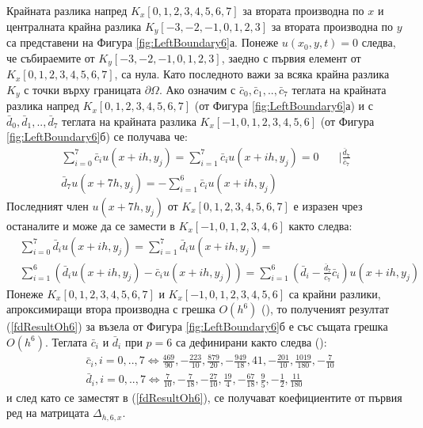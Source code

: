 \documentclass[a4paper]{article}
\newcommand{\rf}[1]{(\ref{#1})}
\theoremstyle{remark}
\begin{document}
\begin{large}
Крайната разлика напред $K_x[0,1,2,3,4,5,6,7]$ за втората производна по $x$ и централната крайна разлика $K_y[-3,-2,-1,0,1,2,3]$ за втората производна по $y$ са представени на Фигура \ref{fig:LeftBoundary6}а. Понеже $u(x_0, y, t) = 0$ следва, че събираемите от $K_y[-3,-2,-1,0,1,2,3]$, заедно с първия елемент от $K_x[0,1,2,3,4,5,6,7]$, са нула. Като последното важи за всяка крайна разлика $K_y$ с точки върху границата $\partial \Omega$. Ако означим с $\bar c_0, \bar c_1, .., \bar c_7$ теглата на крайната разлика напред $K_x[0,1,2,3,4,5,6,7]$ (от Фигура \ref{fig:LeftBoundary6}а) и с $\bar d_0, \bar d_1,.., \bar d_7$ теглата на крайната разлика $K_x[-1,0,1,2,3,4,5,6]$ (от Фигура \ref{fig:LeftBoundary6}б) се получава че:
\begin{align}\label{deltaOh6Zero}
\sum\limits_{i=0}^{7} \bar c_i u(x+ih, y_j) = \sum\limits_{i=1}^{7} \bar c_i u(x+ih, y_j) = 0 &  \quad | \frac{\bar d_7}{\bar c_7} \nonumber\\
\bar d_7 u(x+7h, y_j) = -\sum\limits_{i=1}^{6} \bar c_i u(x+ih, y_j) & 
\end{align}
Последният член $u(x+7h, y_j)$ от $K_x[0,1,2,3,4,5,6,7]$ е изразен чрез останалите и може да се замести в $K_x[-1,0,1,2,3,4,6]$ както следва:
\begin{align}\label{fdResultOh6}
&\sum\limits_{i=0}^{7} \bar d_i u(x+ih, y_j) = \sum\limits_{i=1}^{7} \bar d_i u(x+ih, y_j)  =  \\
&\sum\limits_{i=1}^{6} \left( \bar d_i u(x+ih, y_j) - \bar c_i u(x+ih, y_j) \right) = \sum\limits_{i=1}^{6} \left( \bar d_i - \frac{\bar d_7}{\bar c_7} \bar c_i \right) u(x+ih, y_j) \nonumber
\end{align}
Понеже $K_x[0,1,2,3,4,5,6,7]$ и $K_x[-1,0,1,2,3,4,5,6]$ са крайни разлики, апроксимиращи втора производна с грешка $O(h^6)$ (\cite{forn}), то полученият резултат \rf{fdResultOh6} за възела от Фигура \ref{fig:LeftBoundary6}б е със същата грешка $O(h^6)$. Теглата $\bar c_i$ и $\bar d_i$ при $p=6$ са дефинирани както следва (\cite{forn}):
\begin{align}
&\bar c_i, i = 0,..,7 \iff \frac{469}{90}, -\frac{223}{10}, \frac{879}{20}, -\frac{949}{18}, 41, -\frac{201}{10}, \frac{1019}{180}, -\frac{7}{10} \\
&\bar d_i, i = 0,..,7 \iff \frac{7}{10}, -\frac{7}{18}, -\frac{27}{10}, \frac{19}{4}, -\frac{67}{18}, \frac{9}{5}, -\frac{1}{2}, \frac{11}{180}
\end{align}
и след като се заместят в \rf{fdResultOh6}, се получават коефициентите от първия ред на матрицата $\Delta_{h,6,x}$. 


\end{large}
\end{document}
